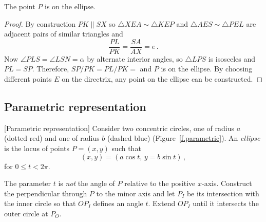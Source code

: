 \begin{theorem}\label{thm.point-on-an-ellipse}
The point $P$ is on the ellipse.
\end{theorem}
\begin{proof}
By construction $PK\parallel SX$ so $\triangle XEA\sim \triangle KEP$ and $\triangle AES\sim \triangle PEL$ are adjacent pairs of similar triangles and
\[
\frac{PL}{PK}=\frac{SA}{AX}=e\,.
\]
Now $\angle PLS = \angle LSN=\alpha$ by alternate interior angles, so $\triangle LPS$ is isosceles and $PL=SP$. Therefore, $SP/PK=PL/PK=$ and $P$ is on the ellipse. By choosing different points $E$ on the directrix, any point on the ellipse can be constructed.\hqed
\end{proof}

\subsection*{Parametric representation}

\begin{definition}\label{def.parametric}[Parametric representation]
Consider two concentric circles, one of radius $a$ (dotted red) and one of radius $b$ (dashed blue) (Figure~\ref{f.parametric}). An \emph{ellipse} is the locus of points $P=(x,y)$ such that
\[
(x,y)= (a\cos t,\, y = b \sin t)\,,
\]
for $0\le t < 2\pi$.
\end{definition}
The parameter $t$ is \emph{not} the angle of $P$ relative to the positive $x$-axis. Construct the perpendicular through $P$ to the minor axis and let $P_I$ be its intersection with the inner circle so that $OP_I$ defines an angle $t$.  Extend $OP_I$ until it intersects the outer circle at $P_O$. 


